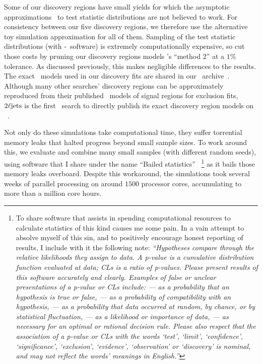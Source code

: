 Some of our discovery regions have small yields for which the asymptotic
approximations~\cite{Cowan:2010js} to test statistic distributions are not
believed to work.
For consistency between our five discovery regions, we therefore use the
alternative toy simulation approximation for all of them.
Sampling of the test statistic distributions
(with \histfitter-\roofit\ software)
is extremely computationally expensive, so cut those costs by pruning our
discovery regions models \histfitter's ``method 2'' at a $1\%$ tolerance.
As discussed previously, this makes negligible differences to the results.
The exact \histfactory\ models used in our discovery fits are shared in our
\hepdata\ archive~\cite{hepdata.116034}.
Although many other searches' discovery regions can be approximately reproduced
from their published \pyhf\ models of signal regions for exclusion fits,
$2\ell\mathrm{jets}$ is the first \atlas\ search to directly publish its exact discovery
region models on \hepdata~\cite{
SUSY-2019-08,
hepdata.90607,
SUSY-2018-10,
hepdata.97041,
SUSY-2018-04,
hepdata.92006,
SUSY-2018-32,
hepdata.89413,
atlas2022searches,
hepdata.116034,
atlas_rjr_3l_SUSY_2019_09,
hepdata.95751,
SUSY-2018-36,
hepdata.99806,
atlas_rjr_mimic_SUSY_2018_06,
hepdata.91127,
SUSY-2018-09,
hepdata.91214,
SUSY-2018-02,
hepdata.103062,
atlas_susy_compressed_2l_2018_run2,
hepdata.91374,
SUSY-2018-33,
hepdata.91760,
SUSY-2018-31,
hepdata.89408,
atlas_susy_strong_0l,
hepdata.95664
}.

Not only do these simulations take computational time, they suffer
torrential memory leaks that halted progress beyond small sample sizes.
To work around this, we evaluate and combine many small samples (with different
random seeds), using software that I share under the name
``Bailed statistics''~\cite{bailedstatisticsgithub}%
\footnote{%
To share software that assists in spending computational resources to
calculate statistics of this kind causes me some pain.
In a vain attempt to absolve myself of this sin, and to positively encourage
honest reporting of results, I include with it the following note:
\emph{%
``Hypotheses compare through the relative likelihoods they assign to data.
A p-value is a cumulative distribution function evaluated at data; CLs is a
ratio of p-values.
Please present results of this software accurately and clearly.
Examples of false or unclear presentations of a p-value or CLs include:
--- as a probability that an hypothesis is true or false,
--- as a probability of compatibility with an hypothesis,
--- as a probability that data occurred at random, by chance, or by statistical fluctuation,
--- as a likelihood or importance of data,
--- as necessary for an optimal or rational decision rule.
Please also respect that the association of a p-value or CLs with the words
`test', `limit', `confidence', `significance', `exclusion', `evidence',
`observation' or `discovery' is nominal,
and may not reflect the words' meanings in English.''
}%
}
as it bails those memory leaks overboard.
Despite this workaround, the simulations took several weeks of parallel
processing on around $1500$ processor cores, accumulating to more than a
million core hours.

